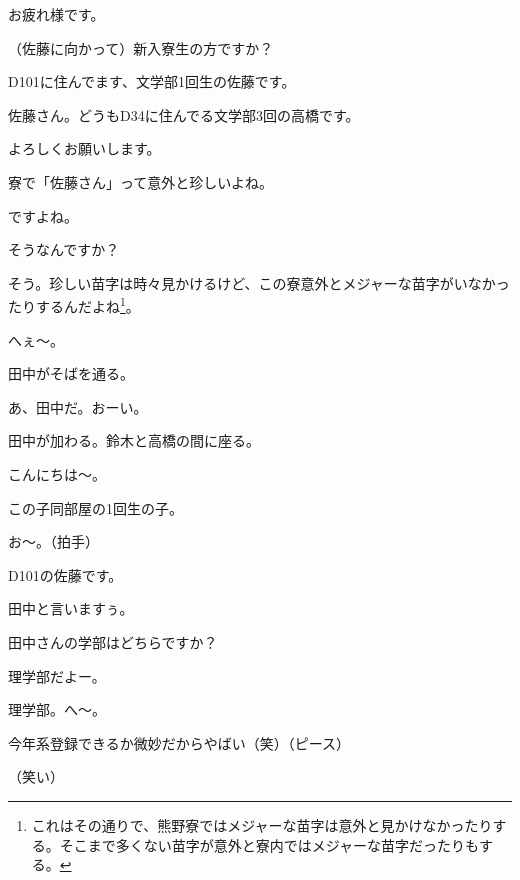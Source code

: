 \begin{multicols}{2}
お疲れ様です。

（佐藤に向かって）新入寮生の方ですか？

D101に住んでます、文学部1回生の佐藤です。

佐藤さん。どうもD34に住んでる文学部3回の高橋です。

よろしくお願いします。

寮で「佐藤さん」って意外と珍しいよね。

ですよね。

そうなんですか？

そう。珍しい苗字は時々見かけるけど、この寮意外とメジャーな苗字がいなかったりするんだよね\footnote{これはその通りで、熊野寮ではメジャーな苗字は意外と見かけなかったりする。そこまで多くない苗字が意外と寮内ではメジャーな苗字だったりもする。}。

へぇ～。

田中がそばを通る。
\par
{}
あ、田中だ。おーい。
\par
田中が加わる。鈴木と高橋の間に座る。
\par
{}
こんにちは～。

この子同部屋の1回生の子。

お～。（拍手）

D101の佐藤です。

田中と言いますぅ。

田中さんの学部はどちらですか？

理学部だよー。

理学部。へ～。

今年系登録できるか微妙だからやばい（笑）（ピース）

（笑い）


\end{multicols}
